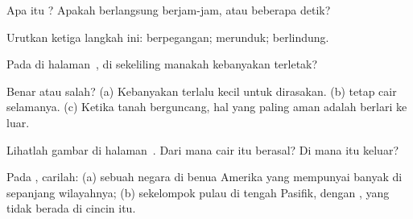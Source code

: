 \begin{exercise}[$\star$]\label{exo:g4:volcanoes-earthquakes-first-look:2}
Apa itu ? Apakah  berlangsung berjam-jam, atau beberapa detik?
\end{exercise}

\begin{exercise}[$\star$]\label{exo:g4:volcanoes-earthquakes-first-look:3}
Urutkan ketiga langkah ini: berpegangan; merunduk; berlindung.
\end{exercise}

\begin{exercise}[$\star$]\label{exo:g4:volcanoes-earthquakes-first-look:4}
Pada  di halaman~\pageref{fig:g4:volcanoes-earthquakes-first-look:map},
di sekeliling  manakah kebanyakan  terletak?
\end{exercise}

\begin{exercise}[$\star$]\label{exo:g4:volcanoes-earthquakes-first-look:5}
Benar atau salah? (a) Kebanyakan  terlalu kecil untuk dirasakan.
(b)  tetap cair selamanya. (c) Ketika tanah berguncang, hal yang paling
aman adalah berlari ke luar.
\end{exercise}

\begin{exercise}[$\star$]\label{exo:g4:volcanoes-earthquakes-first-look:6}
Lihatlah gambar  di halaman~\pageref{fig:g4:volcanoes-earthquakes-first-look:volcano}.
Dari mana  cair itu berasal? Di mana  itu keluar?
\end{exercise}

\begin{exercise}[$\star\star$]\label{exo:g4:volcanoes-earthquakes-first-look:7}
Pada , carilah: (a) sebuah negara di benua Amerika yang mempunyai
banyak  di sepanjang wilayahnya; (b) sekelompok pulau di tengah
 Pasifik, dengan , yang tidak berada di cincin itu.
\end{exercise}

